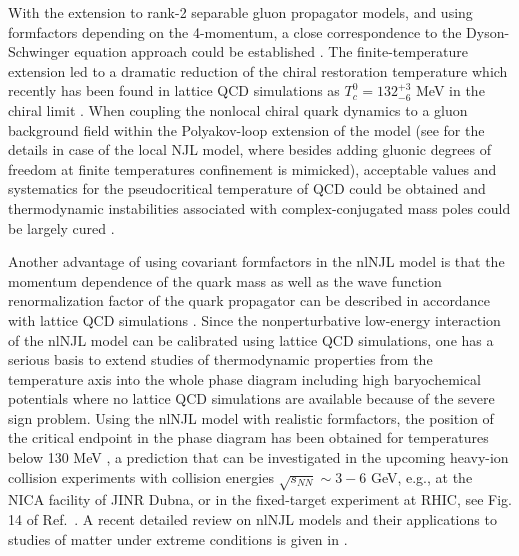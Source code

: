 \documentclass[%
 reprint,
superscriptaddress,
nofootinbib,
 amsmath,amssymb,
 aps,
]{revtex4-1}
\begin{document}
With the extension to rank-2 separable gluon propagator models, 
and using formfactors depending on the 4-momentum, a close correspondence to the Dyson-Schwinger equation approach could be established \cite{Burden:1996xs}. The finite-temperature extension led to a dramatic reduction of the chiral restoration temperature 
\cite{Blaschke:2000gd} which recently has been found in lattice QCD simulations as $T_c^0=132^{+3}_{-6}$ MeV in the chiral limit
\cite{Ding:2019prx}.
When coupling the nonlocal chiral quark dynamics to a gluon background field within the Polyakov-loop extension of the model
(see \cite{Ratti:2005jh} for the details in case of the local NJL model, where besides adding gluonic degrees of freedom at finite temperatures confinement is mimicked), 
acceptable values and systematics for the pseudocritical temperature of QCD could be obtained \cite{Horvatic:2010md,Radzhabov:2010dd} and thermodynamic instabilities associated with complex-conjugated mass poles could be largely cured \cite{Benic:2012ec}. 

Another advantage of using covariant formfactors in the nlNJL model is that the momentum dependence of the quark mass as well as the wave function renormalization factor of the quark propagator can be described in accordance with lattice QCD simulations \cite{Noguera:2008cm}.
Since the nonperturbative low-energy interaction of the nlNJL model can be calibrated using lattice QCD simulations, one has a serious basis to extend studies of thermodynamic properties from the temperature axis into the whole phase diagram including high baryochemical potentials where no lattice QCD simulations are available because of the severe sign problem. 
Using the nlNJL model with realistic formfactors, the position of the critical endpoint in the phase diagram has been obtained for temperatures below 130 MeV \cite{Contrera:2012wj,Contrera:2016rqj}, a prediction that can be investigated in the upcoming heavy-ion collision experiments with collision energies $\sqrt{s_{NN}}\sim 3 - 6$ GeV, e.g., at the NICA facility of JINR Dubna, or in the fixed-target experiment at RHIC, see Fig. 14 of Ref.~\cite{Senger:2021dot}.  
A recent detailed review on nlNJL models and their applications to studies of matter under extreme conditions is given in \cite{Dumm:2021vop}. 
\end{document}
